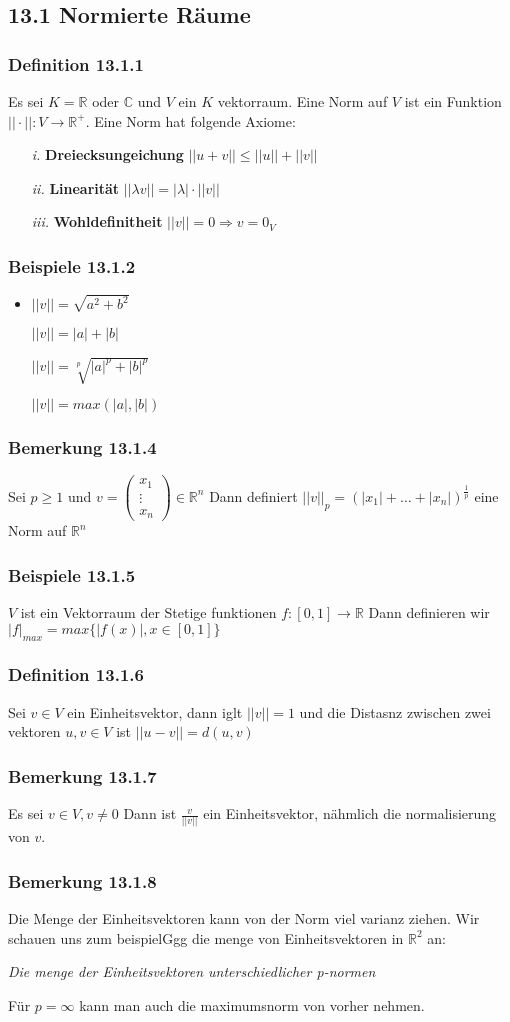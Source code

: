 \documentclass{article}
\newcommand{\beispiel}[1]{\subsubsection*{Beispiele {#1}}}
\newcommand{\bemerkung}[1]{\subsubsection*{Bemerkung {#1}}}
\newcommand{\definition}[1]{\subsubsection*{Definition {#1}}}
\begin{document}
\subsection*{13.1 Normierte Räume}
\definition{13.1.1} Es sei $K=\mathbb{R}$ oder $\mathbb{C}$ und $V$ ein $K$ vektorraum. Eine Norm auf $V$ ist ein Funktion $||\cdot||:V\rightarrow \mathbb{R}^+$. Eine Norm hat folgende Axiome:
\begin{itemize}
  \item[\textit{i.}]{\textbf{Dreiecksungeichung} $||u+v||\le||u||+||v||$}
  \item[\textit{ii.}]{\textbf{Linearität} $||\lambda v||=|\lambda|\cdot||v||$}
  \item[\textit{iii.}]{\textbf{Wohldefinitheit} $||v||=0\Rightarrow v=0_V$}
\end{itemize}
\beispiel{13.1.2}
\begin{itemize}
  \item{$||v||=\sqrt{a^2+b^2}$}
  \item[]{$||v||=|a|+|b|$}
  \item[]{$||v||=\sqrt[p]{|a|^p+|b|^p}$}
  \item[]{$||v||=max(|a|,|b|)$}
\end{itemize}
\bemerkung{13.1.4} Sei $p\ge1$ und $v=\begin{pmatrix}x_1\\\vdots\\x_n\end{pmatrix}\in\mathbb{R}^n$ Dann definiert $||v||_p=(|x_1|+\hdots+|x_n|)^{\frac{1}{p}}$ eine Norm auf $\mathbb{R}^n$
\beispiel{13.1.5} $V$ ist ein Vektorraum der Stetige funktionen $f:[0,1]\rightarrow \mathbb{R}$ Dann definieren wir $|f|_{max}=max\lbrace|f(x)|, x\in[0,1]\rbrace$
\definition{13.1.6} Sei $v\in V$ ein Einheitsvektor, dann iglt $||v||=1$ und die Distasnz zwischen zwei vektoren $u,v \in V$ ist $||u-v||=d(u,v)$
\bemerkung{13.1.7} Es sei $v\in V, v\neq 0$ Dann ist $\frac{v}{||v||}$ ein Einheitsvektor, nähmlich die normalisierung von $v$.
\bemerkung{13.1.8}Die Menge der Einheitsvektoren kann von der Norm viel varianz ziehen. Wir schauen uns zum beispielGgg die menge von Einheitsvektoren in $\mathbb{R}^2$ an:
\begin{center}
{}
\scriptsize \textit{Die menge der Einheitsvektoren unterschiedlicher p-normen}\normalsize
\end{center}
Für $p=\infty$ kann man auch die maximumsnorm von vorher nehmen.
\end{document}
